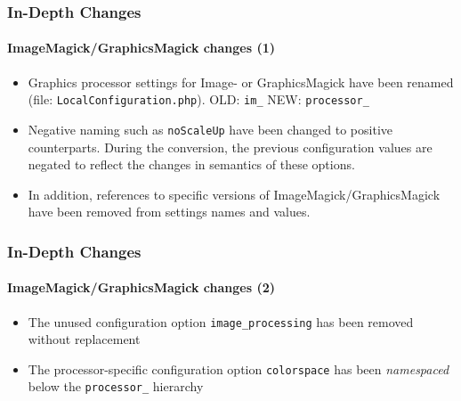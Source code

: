 \begin{frame}[fragile]
	\frametitle{In-Depth Changes}
	\framesubtitle{ImageMagick/GraphicsMagick changes (1)}

	\lstset{basicstyle=\tiny\ttfamily}

	\begin{itemize}

		\item Graphics processor settings for Image- or GraphicsMagick have been renamed
			(file: \texttt{LocalConfiguration.php}).\newline
			OLD:\tabto{1.0cm} \texttt{im\_}\newline
			NEW:\tabto{1.0cm} \texttt{processor\_}

		\item Negative naming such as \texttt{noScaleUp} have been changed to positive counterparts.
			During the conversion, the previous configuration values are negated to reflect the
			changes in semantics of these options.

		\item In addition, references to specific versions of ImageMagick/GraphicsMagick have been
			removed from settings names and values.

	\end{itemize}

\end{frame}

\begin{frame}[fragile]
	\frametitle{In-Depth Changes}
	\framesubtitle{ImageMagick/GraphicsMagick changes (2)}

	\lstset{basicstyle=\tiny\ttfamily}

	\begin{itemize}

		\item The unused configuration option \texttt{image\_processing} has been removed without
			replacement

		\item The processor-specific configuration option \texttt{colorspace} has been \textit{namespaced}
			below the \texttt{processor\_} hierarchy

	\end{itemize}

\end{frame}

